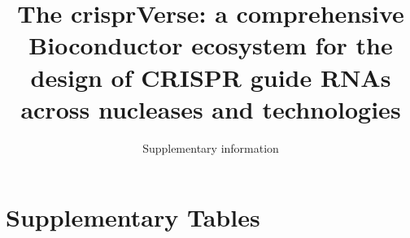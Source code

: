 \documentclass[pdftex,english,10pt]{article}
\begin{document}
\renewcommand\Affilfont{\small}


\title{The crisprVerse: a comprehensive Bioconductor ecosystem for the design of CRISPR guide RNAs across nucleases and technologies}
\author{Supplementary information}




\maketitle





\clearpage
\section*{Supplementary Tables}




\renewcommand{\tablename}{Supplementary Table}
\setcounter{table}{0}
\makeatletter 
\renewcommand{\thetable}{\@arabic\c@table}
\makeatother
\end{document}
